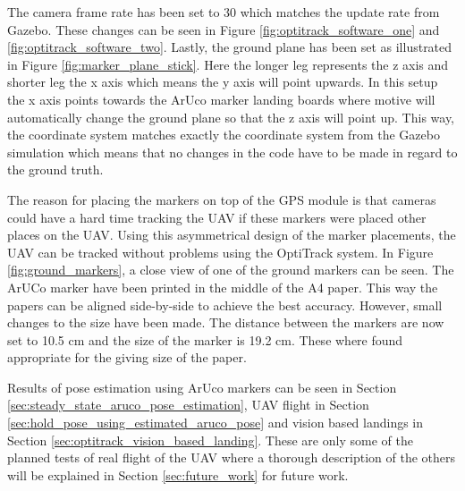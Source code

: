 \documentclass[../Head/report.tex]{subfiles}
\begin{document}
The camera frame rate has been set to 30 which matches the update rate from Gazebo. These changes can be seen in Figure \ref{fig:optitrack_software_one} and \ref{fig:optitrack_software_two}. Lastly, the ground plane has been set as illustrated in Figure \ref{fig:marker_plane_stick}. Here the longer leg represents the z axis and shorter leg the x axis which means the y axis will point upwards. In this setup the x axis points towards the ArUco marker landing boards where motive will automatically change the ground plane so that the z axis will point up. This way, the coordinate system matches exactly the coordinate system from the Gazebo simulation which means that no changes in the code have to be made in regard to the ground truth. 

The reason for placing the markers on top of the GPS module is that cameras could have a hard time tracking the UAV if these markers were placed other places on the UAV. Using this asymmetrical design of the marker placements, the UAV can be tracked without problems using the OptiTrack system. In Figure \ref{fig:ground_markers}, a close view of one of the ground markers can be seen. The ArUCo marker have been printed in the middle of the A4 paper. This way the papers can be aligned side-by-side to achieve the best accuracy. However, small changes to the size have been made. The distance between the markers are now set to 10.5 cm and the size of the marker is 19.2 cm. These where found appropriate for the giving size of the paper.      

Results of pose estimation using ArUco markers can be seen in Section \ref{sec:steady_state_aruco_pose_estimation}, UAV flight in Section \ref{sec:hold_pose_using_estimated_aruco_pose} and vision based landings in Section \ref{sec:optitrack_vision_based_landing}. These are only some of the planned tests of real flight of the UAV where a thorough description of the others will be explained in Section \ref{sec:future_work} for future work.  
\end{document}
